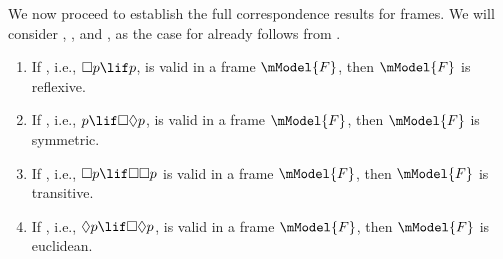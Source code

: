 \documentclass[../../../include/open-logic-section]{subfiles}
\begin{document}
We now proceed to establish the full correspondence results for
frames. We will consider , ,  and , as the case
for  already follows from .

\begin{thm}
  \begin{enumerate}
  \item If , i.e., $\Box p \lif p$, is valid in a frame
    $\mModel{F}$, then $\mModel{F}$ is reflexive.
  \item If , i.e., $p \lif \Box\Diamond p$, is valid in a frame
    $\mModel{F}$, then $\mModel{F}$ is symmetric.
  \item If , i.e., $\Box p \lif \Box\Box p$ is valid in a frame
    $\mModel{F}$, then $\mModel{F}$ is transitive.
  \item If , i.e., $\Diamond p \lif \Box\Diamond p$, is valid in
    a frame $\mModel{F}$, then $\mModel{F}$ is euclidean.
  \end{enumerate}
\end{thm}
\end{document}
